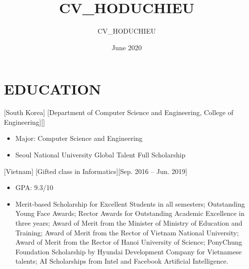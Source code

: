 \documentclass{article}
\title{CV_HODUCHIEU}
\author{CV_HODUCHIEU}
\date{June 2020}
\begin{document}

\makecvtitle %


\section{EDUCATION}
[South Korea]
[Department of Computer Science and Engineering, College of Engineering][]
\begin{itemize}
\item Major: Computer Science and Engineering
\item Seoul National University Global Talent Full Scholarship
\end{itemize}

[Vietnam]
[Gifted class in Informatics][Sep. 2016 – Jun. 2019]
\begin{itemize}
\item GPA: 9.3/10
\item Merit-based Scholarship for Excellent Students in all semesters; Outstanding Young Face Awards;
Rector Awards for Outstanding Academic Excellence in three years; Award of Merit from the Minister
of Ministry of Education and Training; Award of Merit from the Rector of Vietnam National University; Award of Merit from the Rector of
Hanoi University of Science; PonyChung Foundation Scholarship by Hyundai Development Company for
Vietnamese talents; AI Scholarships from Intel and Facebook Artificial Intelligence.
\end{itemize}


\end{document}
